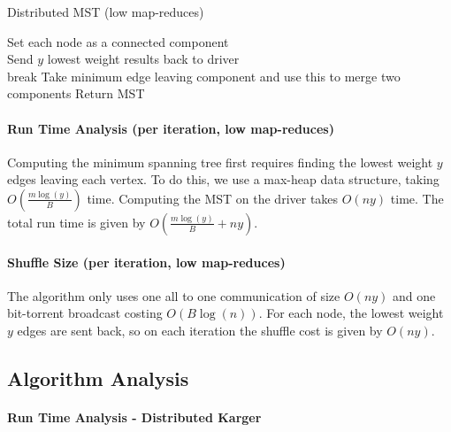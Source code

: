 \documentclass{article}
\begin{document}
\LinesNumbered
\begin{algorithm}[H]
\caption{Distributed MST (low map-reduces)}
Set each node as a connected component \\
 {
  Send $y$ lowest weight results back to driver \\
   {
     {
    break
    }
     {
      Take minimum edge leaving component and use this to merge two
      components
    }
  }
}
Return MST
\end{algorithm}

\paragraph{Run Time Analysis (per iteration, low map-reduces)}

Computing the minimum spanning tree first requires finding the lowest weight $y$ edges leaving each vertex. To do this, we use a max-heap data structure, taking $O(\frac{m\log(y)}{B})$ time. Computing the MST on the driver takes $O(n y)$ time. The total run time is given by $O(\frac{m \log(y)}{B} + ny)$.

\paragraph{Shuffle Size (per iteration, low map-reduces)}

The algorithm only uses one all to one communication of size $O(ny)$ and one bit-torrent broadcast costing $O(B \log(n))$. For each node, the lowest weight $y$ edges are sent back, so on each iteration the shuffle cost is given by $O(ny)$.

\subsection{Algorithm Analysis}

\paragraph{Run Time Analysis - Distributed Karger}
\end{document}
